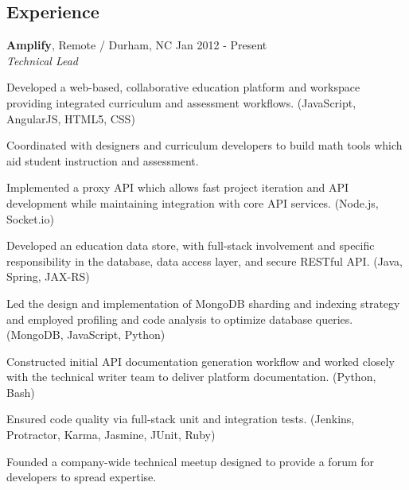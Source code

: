 \documentclass[margin,line]{resume}
\begin{document}
\begin{resume}

  \section{\mysidestyle \textcolor{mySideColor}{Experience}}

  \textbf{Amplify}, Remote / Durham, NC \hfill Jan 2012 - Present\vspace{1mm}\\
  \textsl{Technical Lead}\\
  \vspace{-3mm}
  \begin{list2}
\item Developed a web-based, collaborative education platform and workspace providing integrated curriculum and assessment workflows. (JavaScript, AngularJS, HTML5, CSS)
\item Coordinated with designers and curriculum developers to build math tools which aid student instruction and assessment.
\item Implemented a proxy API which allows fast project iteration and API development while maintaining integration with core API services. (Node.js, Socket.io)
\item Developed an education data store, with full-stack involvement and specific responsibility in the database, data access layer, and secure RESTful API. (Java, Spring, JAX-RS)
\item Led the design and implementation of MongoDB sharding and indexing strategy and employed profiling and code analysis to optimize database queries. (MongoDB, JavaScript, Python)
\item Constructed initial API documentation generation workflow and worked closely with the technical writer team to deliver platform documentation. (Python, Bash)
\item Ensured code quality via full-stack unit and integration tests. (Jenkins, Protractor, Karma, Jasmine, JUnit, Ruby)
\item Founded a company-wide technical meetup designed to provide a forum for developers to spread expertise.
  \end{list2}


\end{resume}
\end{document}
